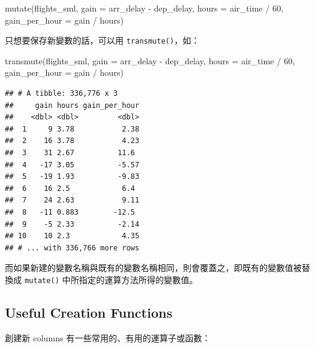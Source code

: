 \documentclass[
]{book}
\newenvironment{Shaded}{\begin{snugshade}}{\end{snugshade}}
\newcommand{\AttributeTok}[1]{\textcolor[rgb]{0.77,0.63,0.00}{#1}}
\newcommand{\DecValTok}[1]{\textcolor[rgb]{0.00,0.00,0.81}{#1}}
\newcommand{\FunctionTok}[1]{\textcolor[rgb]{0.00,0.00,0.00}{#1}}
\newcommand{\NormalTok}[1]{#1}
\newcommand{\SpecialCharTok}[1]{\textcolor[rgb]{0.00,0.00,0.00}{#1}}
\theoremstyle{definition}
\theoremstyle{remark}
\begin{document}
\begin{Shaded}
\begin{Highlighting}[]
\FunctionTok{mutate}\NormalTok{(flights\_sml,}
       \AttributeTok{gain =}\NormalTok{ arr\_delay }\SpecialCharTok{{-}}\NormalTok{ dep\_delay,}
       \AttributeTok{hours =}\NormalTok{ air\_time }\SpecialCharTok{/} \DecValTok{60}\NormalTok{,}
       \AttributeTok{gain\_per\_hour =}\NormalTok{ gain }\SpecialCharTok{/}\NormalTok{ hours)}
\end{Highlighting}
\end{Shaded}

只想要保存新變數的話，可以用 \texttt{transmute()}，如：

\begin{Shaded}
\begin{Highlighting}[]
\FunctionTok{transmute}\NormalTok{(flights\_sml,}
       \AttributeTok{gain =}\NormalTok{ arr\_delay }\SpecialCharTok{{-}}\NormalTok{ dep\_delay,}
       \AttributeTok{hours =}\NormalTok{ air\_time }\SpecialCharTok{/} \DecValTok{60}\NormalTok{,}
       \AttributeTok{gain\_per\_hour =}\NormalTok{ gain }\SpecialCharTok{/}\NormalTok{ hours)}
\end{Highlighting}
\end{Shaded}

\begin{verbatim}
## # A tibble: 336,776 x 3
##     gain hours gain_per_hour
##    <dbl> <dbl>         <dbl>
##  1     9 3.78           2.38
##  2    16 3.78           4.23
##  3    31 2.67          11.6 
##  4   -17 3.05          -5.57
##  5   -19 1.93          -9.83
##  6    16 2.5            6.4 
##  7    24 2.63           9.11
##  8   -11 0.883        -12.5 
##  9    -5 2.33          -2.14
## 10    10 2.3            4.35
## # ... with 336,766 more rows
\end{verbatim}

而如果新建的變數名稱與既有的變數名稱相同，則會覆蓋之，即既有的變數值被替換成 \texttt{mutate()} 中所指定的運算方法所得的變數值。

\hypertarget{useful-creation-functions}{%
\subsection{Useful Creation Functions}\label{useful-creation-functions}}

創建新 columns 有一些常用的、有用的運算子或函數：
\end{document}
